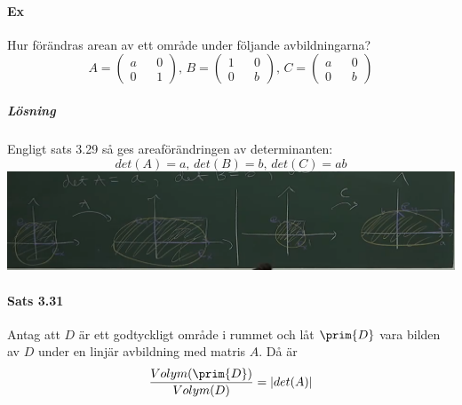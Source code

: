 \paragraph{Ex} Hur förändras arean av ett område under följande avbildningarna?
\begin{equation*}
    A=\begin{pmatrix}a&&0\\0&&1\end{pmatrix}\text{, }B=\begin{pmatrix}1&&0\\0&&b\end{pmatrix}\text{, }C=\begin{pmatrix}a&&0\\0&&b\end{pmatrix}
\end{equation*}

\subparagraph{Lösning} Engligt sats 3.29 så ges areaförändringen av determinanten:
\begin{equation*}
    det(A)=a\text{, }det(B)=b\text{, }det(C)=ab
\end{equation*}
\includegraphics[scale=0.2]{imgs/img05.png}

\paragraph{Sats 3.31} Antag att $D$ är ett godtyckligt område i rummet och låt $\prim{D}$ vara bilden av $D$ under en linjär avbildning med matris $A$.
Då är
\begin{equation*}
    \frac{Volym(\prim{D})}{Volym(D)}=|det(A)|
\end{equation*}

